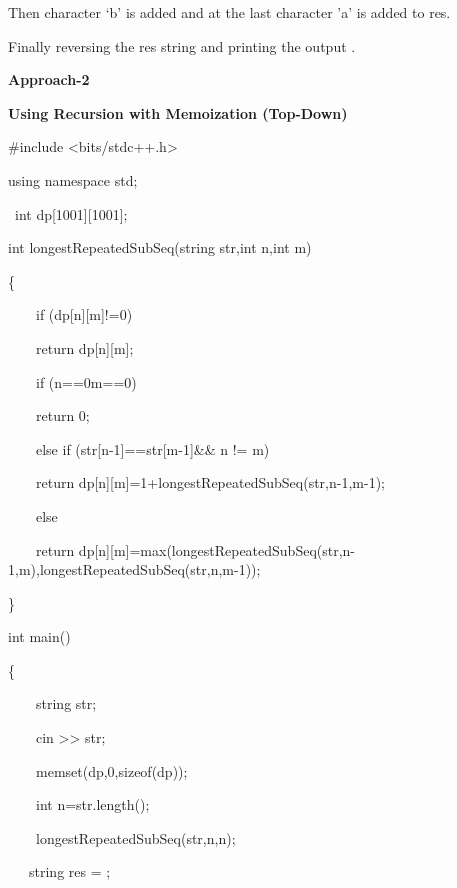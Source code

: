 \documentclass[letterpaper]{article}
\begin{document}
\begin{multicols}{2}
Then character `b' is added and at the last character 'a' is added to res.

Finally reversing the res string and printing the output . 


\bigskip


\bigskip


\bigskip

{\bfseries
Approach-2 }

{\bfseries
Using Recursion with Memoization (Top-Down)}


\bigskip

\#include {\textless}bits/stdc++.h{\textgreater}

using namespace std;

\ int dp[1001][1001];

int longestRepeatedSubSeq(string str,int n,int m)

\{

\ \ \ \ if (dp[n][m]!=0)

\ \ \ \ return dp[n][m];

\ \ \ \ if (n==0{\textbar}{\textbar}m==0)

\ \ \ \ return 0;

\ \ \ \ else if (str[n-1]==str[m-1]\&\& n != m)

\ \ \ \ return dp[n][m]=1+longestRepeatedSubSeq(str,n-1,m-1);

\ \ \ \ else

\ \ \ \ return dp[n][m]=max(longestRepeatedSubSeq(str,n-1,m),longestRepeatedSubSeq(str,n,m-1));


\bigskip


\bigskip


\bigskip


\bigskip

\}


\bigskip


\bigskip

int main()

\{

\ \ \ \ string str;

\ \ \ \ cin {\textgreater}{\textgreater} str;

\ \ \ \ memset(dp,0,sizeof(dp));

\ \ \ \ int n=str.length();

\ \ \ \ longestRepeatedSubSeq(str,n,n);


\bigskip

\ \ \ string res = {\textquotedbl}{\textquotedbl};


\bigskip


\end{multicols}
\end{document}
